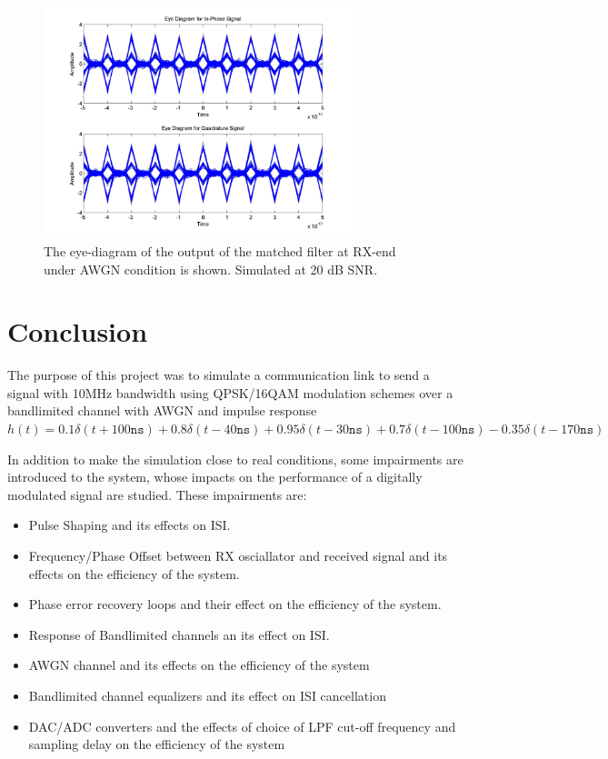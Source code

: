 \documentclass[]{article}
\begin{document}
\begin{figure}[H]
\centering
\includegraphics[width=0.8\textwidth]{awgn_eye_qam20.jpg}
\caption{ The eye-diagram of the output of the matched filter at RX-end under AWGN condition is shown. Simulated at 20 dB SNR.\label{fig:qamEyeAWGN}}
\end{figure}

\newpage
\section{Conclusion}
\label{sec:conc}

The purpose of this project was to simulate a communication link to send a signal with 10MHz bandwidth using QPSK/16QAM modulation schemes over a bandlimited channel with AWGN and impulse response  $h(t) = 0.1\delta(t + 100 \mathtt{ns}) + 0.8\delta(t -40 \mathtt{ns}) + 0.95\delta(t - 30 \mathtt{ns}) + 0.7\delta(t - 100 \mathtt{ns}) - 0.35\delta(t - 170 \mathtt{ns}) $

In addition to make the simulation close to real conditions, some impairments are introduced to the system, whose impacts on the performance of a digitally modulated signal are studied. These impairments are:
\begin{itemize}
\item Pulse Shaping and its effects on ISI.
\item Frequency/Phase Offset between RX osciallator and received signal and its effects on the efficiency of the system.
\item Phase error recovery loops and their effect on the efficiency of the system.
\item Response of Bandlimited channels an its effect on ISI.
\item AWGN channel and its effects on the efficiency of the system
\item Bandlimited channel equalizers and its effect on ISI cancellation
\item DAC/ADC converters and the effects of choice of LPF cut-off frequency and sampling delay on the efficiency of the system  
\end{itemize}
\end{document}
